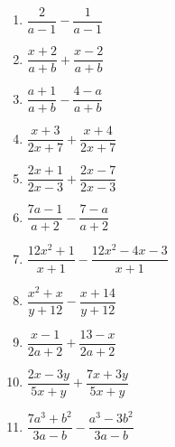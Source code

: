 \documentclass[10pt, a4paper]{article}
\begin{document}
\begin{enumerate}
\begin{multicols}{3}
\begin{enumerate}
			\item $\dfrac{2}{a-1}-\dfrac{1}{a-1}$ 
			\item $\dfrac{x+2}{a+b}+\dfrac{x-2}{a+b}$ 
			\item $\dfrac{a+1}{a+b}-\dfrac{4-a}{a+b}$ 
			\item $\dfrac{x+3}{2x+7}+\dfrac{x+4}{2x+7}$ 
			\item $\dfrac{2x+1}{2x-3}+\dfrac{2x-7}{2x-3}$ 
			\item $\dfrac{7a-1}{a+2}-\dfrac{7-a}{a+2}$ 
			\item $\dfrac{12x^2+1}{x+1}-\dfrac{12x^2-4x-3}{x+1}$ 
			\item $\dfrac{x^2+x}{y+12}-\dfrac{x+14}{y+12}$ 
			\item $\dfrac{x-1}{2a+2}+\dfrac{13-x}{2a+2}$ 
			\item $\dfrac{2x-3y}{5x+y}+\dfrac{7x+3y}{5x+y}$ 
			\item $\dfrac{7a^3+b^2}{3a-b}-\dfrac{a^3-3b^2}{3a-b}$ 
		\end{enumerate}	
	\end{multicols}	
\end{enumerate}
\end{document}
